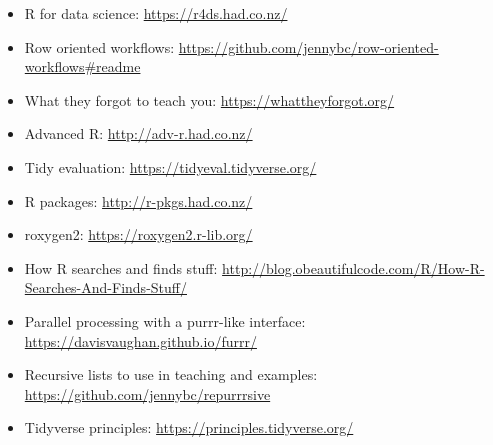 \documentclass[]{book}
\begin{document}
\begin{itemize}
\item
  R for data science: \url{https://r4ds.had.co.nz/}
\item
  Row oriented workflows: \url{https://github.com/jennybc/row-oriented-workflows\#readme}
\item
  What they forgot to teach you: \url{https://whattheyforgot.org/}
\item
  Advanced R: \url{http://adv-r.had.co.nz/}
\item
  Tidy evaluation: \url{https://tidyeval.tidyverse.org/}
\item
  R packages: \url{http://r-pkgs.had.co.nz/}
\item
  roxygen2: \url{https://roxygen2.r-lib.org/}
\item
  How R searches and finds stuff: \url{http://blog.obeautifulcode.com/R/How-R-Searches-And-Finds-Stuff/}
\item
  Parallel processing with a purrr-like interface: \url{https://davisvaughan.github.io/furrr/}
\item
  Recursive lists to use in teaching and examples: \url{https://github.com/jennybc/repurrrsive}
\item
  Tidyverse principles: \url{https://principles.tidyverse.org/}
\end{itemize}


\end{document}
